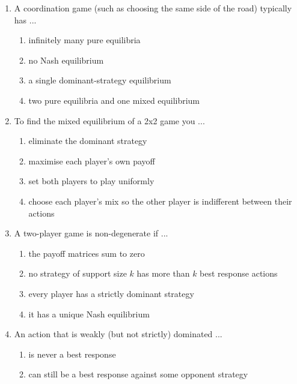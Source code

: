 \documentclass[11pt]{article}
\begin{document}
\begin{enumerate}[itemsep=6pt]
  \begin{enumerate}
    \item no Nash equilibrium unless there is a dominant strategy
    \item a Nash equilibrium only if it is zero sum
    \item a unique Nash equilibrium
    \item at least one Nash equilibrium, possibly in mixed strategies
  \end{enumerate}
  \item A coordination game (such as choosing the same side of the road) typically has ...
  \begin{enumerate}
    \item infinitely many pure equilibria
    \item no Nash equilibrium
    \item a single dominant-strategy equilibrium
    \item two pure equilibria and one mixed equilibrium
  \end{enumerate}
  \item To find the mixed equilibrium of a 2x2 game you ...
  \begin{enumerate}
    \item eliminate the dominant strategy
    \item maximise each player's own payoff
    \item set both players to play uniformly
    \item choose each player's mix so the other player is indifferent between their actions
  \end{enumerate}
  \item A two-player game is non-degenerate if ...
  \begin{enumerate}
    \item the payoff matrices sum to zero
    \item no strategy of support size \(k\) has more than \(k\) best response actions
    \item every player has a strictly dominant strategy
    \item it has a unique Nash equilibrium
  \end{enumerate}
  \item An action that is weakly (but not strictly) dominated ...
  \begin{enumerate}
    \item is never a best response
    \item can still be a best response against some opponent strategy

\end{enumerate}
\end{enumerate}
\end{document}
